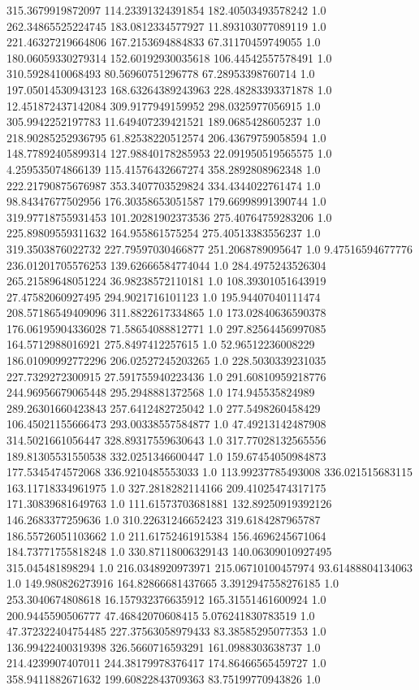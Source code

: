 315.3679919872097	114.23391324391854	182.40503493578242	1.0
262.34865525224745	183.0812334577927	11.893103077089119	1.0
221.46327219664806	167.2153694884833	67.31170459749055	1.0
180.06059330279314	152.60192930035618	106.44542557578491	1.0
310.5928410068493	80.56960751296778	67.28953398760714	1.0
197.05014530943123	168.63264389243963	228.48283393371878	1.0
12.451872437142084	309.9177949159952	298.0325977056915	1.0
305.9942252197783	11.649407239421521	189.0685428605237	1.0
218.90285252936795	61.82538220512574	206.43679759058594	1.0
148.77892405899314	127.98840178285953	22.091950519565575	1.0
4.259535074866139	115.41576432667274	358.2892808962348	1.0
222.21790875676987	353.3407703529824	334.4344022761474	1.0
98.84347677502956	176.30358653051587	179.66998991390744	1.0
319.97718755931453	101.20281902373536	275.40764759283206	1.0
225.89809559311632	164.955861575254	275.40513383556237	1.0
319.3503876022732	227.79597030466877	251.2068789095647	1.0
9.47516594677776	236.01201705576253	139.62666584774044	1.0
284.4975243526304	265.21589648051224	36.98238572110181	1.0
108.39301051643919	27.47582060927495	294.9021716101123	1.0
195.94407040111474	208.57186549409096	311.8822617334865	1.0
173.02840636590378	176.06195904336028	71.58654088812771	1.0
297.82564456997085	164.5712988016921	275.8497412257615	1.0
52.96512236008229	186.01090992772296	206.02527245203265	1.0
228.5030339231035	227.7329272300915	27.591755940223436	1.0
291.60810959218776	244.96956679065448	295.2948881372568	1.0
174.945535824989	289.26301660423843	257.6412482725042	1.0
277.5498260458429	106.45021155666473	293.00338557584877	1.0
47.49213142487908	314.5021661056447	328.89317559630643	1.0
317.77028132565556	189.81305531550538	332.0251346600447	1.0
159.67454050984873	177.5345474572068	336.9210485553033	1.0
113.99237785493008	336.021515683115	163.11718334961975	1.0
327.2818282114166	209.41025474317175	171.30839681649763	1.0
111.61573703681881	132.89250919392126	146.2683377259636	1.0
310.22631246652423	319.6184287965787	186.55726051103662	1.0
211.61752461915384	156.4696245671064	184.73771755818248	1.0
330.87118006329143	140.06309010927495	315.045481898294	1.0
216.0348920973971	215.06710100457974	93.61488804134063	1.0
149.980826273916	164.82866681437665	3.3912947558276185	1.0
253.3040674808618	16.157932376635912	165.31551461600924	1.0
200.9445590506777	47.46842070608415	5.076241830783519	1.0
47.372322404754485	227.37563058979433	83.38585295077353	1.0
136.99422400319398	326.5660716593291	161.0988303638737	1.0
214.4239907407011	244.38179978376417	174.86466565459727	1.0
358.9411882671632	199.60822843709363	83.75199770943826	1.0
